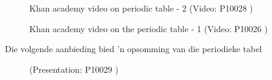         \label{m38757*eip-6}
    \setcounter{subfigure}{0}
	\begin{figure}[H] %
    \textnormal{Khan academy video on periodic table - 2}\vspace{.1in} \nopagebreak
  \label{m38757*yt-media3}\label{m38757*yt-video3}
             { (Video:  P10028 )}
 \end{figure}       \par 
\label{m38760*eip-148}
    \setcounter{subfigure}{0}
	\begin{figure}[H] %
    \textnormal{Khan academy video on the periodic table - 1}\vspace{.1in} \nopagebreak
  \label{m38760*yt-media1}\label{m38760*yt-video1}
             { (Video:  P10026 )}
 \end{figure}       \par 
Die volgende aanbieding bied 'n opsomming van die periodieke tabel
    \setcounter{subfigure}{0}
	\begin{figure}[H] %
    \label{m38757*slidesharemedia}\label{m38757*slideshareflash} { (Presentation:  P10029 )}
 \end{figure}       \par 
    \label{m38757*eip-572}

